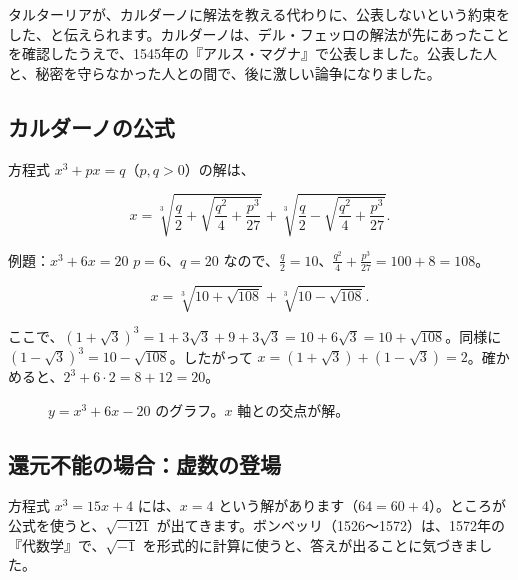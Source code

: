 \documentclass[a4paper,11pt,openany]{ltjsbook}
\begin{document}
タルターリアが、カルダーノに解法を教える代わりに、公表しないという約束をした、と伝えられます。カルダーノは、デル・フェッロの解法が先にあったことを確認したうえで、1545年の『アルス・マグナ』で公表しました。公表した人と、秘密を守らなかった人との間で、後に激しい論争になりました。

\subsection{カルダーノの公式}

方程式 $x^3+px=q$（$p,q>0$）の解は、

\[
x=\sqrt[3]{\frac q2+\sqrt{\frac{q^2}{4}+\frac{p^3}{27}}}+\sqrt[3]{\frac q2-\sqrt{\frac{q^2}{4}+\frac{p^3}{27}}}.
\]

\begin{examplebox}{例題：$x^3+6x=20$}
$p=6$、$q=20$ なので、$\tfrac q2=10$、$\tfrac{q^2}{4}+\tfrac{p^3}{27}=100+8=108$。

\[
x=\sqrt[3]{10+\sqrt{108}}+\sqrt[3]{10-\sqrt{108}}.
\]

ここで、$(1+\sqrt3)^3=1+3\sqrt3+9+3\sqrt3=10+6\sqrt3=10+\sqrt{108}$。同様に $(1-\sqrt3)^3=10-\sqrt{108}$。したがって $x=(1+\sqrt3)+(1-\sqrt3)=2$。確かめると、$2^3+6\cdot2=8+12=20$。
\end{examplebox}

\begin{figure}[htbp]
\centering
{}
\caption{$y=x^3+6x-20$ のグラフ。$x$ 軸との交点が解。}
\end{figure}

\subsection{還元不能の場合：虚数の登場}

方程式 $x^3=15x+4$ には、$x=4$ という解があります（$64=60+4$）。ところが公式を使うと、$\sqrt{-121}$ が出てきます。ボンベッリ（1526〜1572）は、1572年の『代数学』で、$\sqrt{-1}$ を形式的に計算に使うと、答えが出ることに気づきました。
\end{document}
